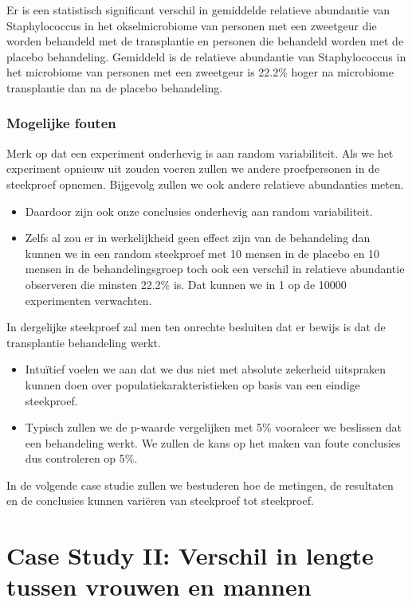 \documentclass[
  12pt,dutch,coursenotes]{book}
\begin{document}
Er is een statistisch significant verschil in gemiddelde relatieve abundantie van Staphylococcus in het okselmicrobiome van personen met een zweetgeur die worden behandeld met de transplantie en personen die behandeld worden met de placebo behandeling.
Gemiddeld is de relatieve abundantie van Staphylococcus in het microbiome van personen met een zweetgeur is 22.2\% hoger na microbiome transplantie dan na de placebo behandeling.

\hypertarget{mogelijke-fouten}{%
\subsubsection{Mogelijke fouten}\label{mogelijke-fouten}}

Merk op dat een experiment onderhevig is aan random variabiliteit. Als we het experiment opnieuw uit zouden voeren zullen we andere proefpersonen in de steekproef opnemen. Bijgevolg zullen we ook andere relatieve abundanties meten.

\begin{itemize}
\item
  Daardoor zijn ook onze conclusies onderhevig aan random variabiliteit.
\item
  Zelfs al zou er in werkelijkheid geen effect zijn van de behandeling dan kunnen we in een random steekproef met 10 mensen in de placebo en 10 mensen in de behandelingsgroep toch ook een verschil in relatieve abundantie observeren die minsten 22.2\% is. Dat kunnen we in 1 op de 10000 experimenten verwachten.
\end{itemize}

In dergelijke steekproef zal men ten onrechte besluiten dat er bewijs is dat de transplantie behandeling werkt.

\begin{itemize}
\item
  Intuïtief voelen we aan dat we dus niet met absolute zekerheid uitspraken kunnen doen over populatiekarakteristieken op basis van een eindige steekproef.
\item
  Typisch zullen we de p-waarde vergelijken met 5\% vooraleer we beslissen dat een behandeling werkt. We zullen de kans op het maken van foute conclusies dus controleren op 5\%.
\end{itemize}

In de volgende case studie zullen we bestuderen hoe de metingen, de resultaten en de conclusies kunnen variëren van steekproef tot steekproef.

\hypertarget{case-study-ii-verschil-in-lengte-tussen-vrouwen-en-mannen}{%
\section{Case Study II: Verschil in lengte tussen vrouwen en mannen}\label{case-study-ii-verschil-in-lengte-tussen-vrouwen-en-mannen}}
\end{document}

